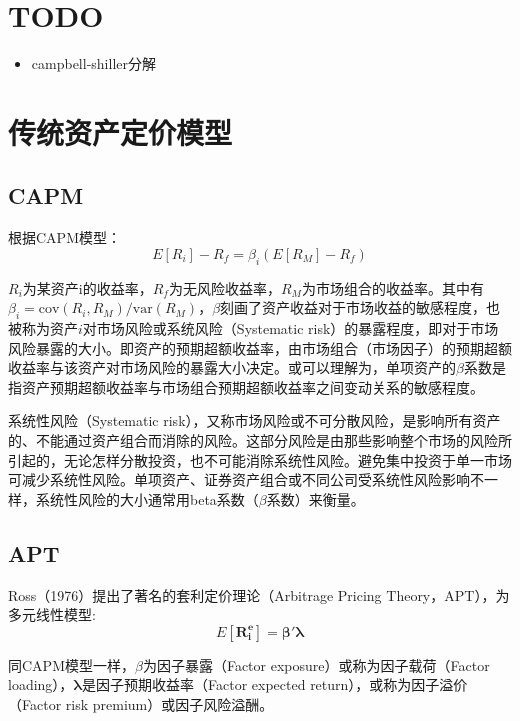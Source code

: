 \documentclass[11pt]{article}
\begin{document}
\maketitle
\tableofcontents

\section{TODO}
\begin{itemize}
    \item campbell-shiller分解
\end{itemize}


\section{传统资产定价模型}

\subsection{CAPM}

根据CAPM模型：
\begin{equation*}
    E[R_i] - R_f = \beta_i(E[R_M]-R_f)
\end{equation*}

$R_i$为某资产i的收益率，$R_f$为无风险收益率，$R_M$为市场组合的收益率。其中有$\beta_i = \text{cov}(R_i,R_M)/\text{var}(R_M)$，$\beta$刻画了资产收益对于市场收益的敏感程度，也被称为资产$i$对市场风险或系统风险（Systematic risk）的暴露程度，即对于市场风险暴露的大小。即资产的预期超额收益率，由市场组合（市场因子）的预期超额收益率与该资产对市场风险的暴露大小决定。或可以理解为，单项资产的$\beta$系数是指资产预期超额收益率与市场组合预期超额收益率之间变动关系的敏感程度。

系统性风险（Systematic risk），又称市场风险或不可分散风险，是影响所有资产的、不能通过资产组合而消除的风险。这部分风险是由那些影响整个市场的风险所引起的，无论怎样分散投资，也不可能消除系统性风险。避免集中投资于单一市场可减少系统性风险。单项资产、证券资产组合或不同公司受系统性风险影响不一样，系统性风险的大小通常用beta系数（$\beta$系数）来衡量。

\subsection{APT}

Ross（1976）提出了著名的套利定价理论（Arbitrage Pricing Theory，APT），为多元线性模型:
\begin{equation*}
    E[\bm{R_i^e}] = \bm{\beta' \lambda}
\end{equation*}

同CAPM模型一样，$\mathbb{\beta}$为因子暴露（Factor exposure）或称为因子载荷（Factor loading），$\bm{\lambda}$是因子预期收益率（Factor expected return），或称为因子溢价（Factor risk premium）或因子风险溢酬。
\end{document}
